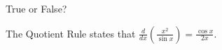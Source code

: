 \documentclass{ximera}
\author{Gregory Hartman \and Matthew Carr}
\begin{document}
\begin{exercise}




True or False?
\begin{center}
The Quotient Rule states that $\frac{d}{dx}\left(\frac{x^2}{\sin x}\right) = \frac{\cos x}{2x}$.
\end{center}

\begin{prompt}
\begin{multipleChoice}
\end{multipleChoice}
\end{prompt}
\end{exercise}
\end{document}
